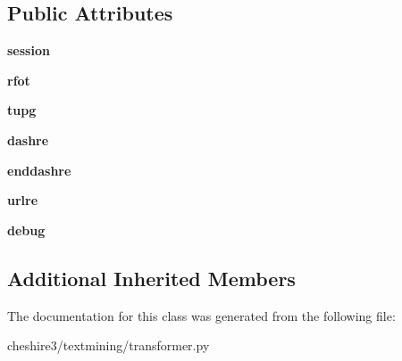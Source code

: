 \subsection*{Public Attributes}
\begin{DoxyCompactItemize}
\item 
\hypertarget{classcheshire3_1_1textmining_1_1transformer_1_1_genia_transformer_a8a36cc2d0b7eefd7f13c4515675b3d67}{{\bfseries session}}\label{classcheshire3_1_1textmining_1_1transformer_1_1_genia_transformer_a8a36cc2d0b7eefd7f13c4515675b3d67}

\item 
\hypertarget{classcheshire3_1_1textmining_1_1transformer_1_1_genia_transformer_a8ed1f95f131d26fbf1276330833123ae}{{\bfseries rfot}}\label{classcheshire3_1_1textmining_1_1transformer_1_1_genia_transformer_a8ed1f95f131d26fbf1276330833123ae}

\item 
\hypertarget{classcheshire3_1_1textmining_1_1transformer_1_1_genia_transformer_a8dfb5b8744586bbe79ceb704948ae986}{{\bfseries tupg}}\label{classcheshire3_1_1textmining_1_1transformer_1_1_genia_transformer_a8dfb5b8744586bbe79ceb704948ae986}

\item 
\hypertarget{classcheshire3_1_1textmining_1_1transformer_1_1_genia_transformer_a81242067af3974ebf3d40e0de9eb1321}{{\bfseries dashre}}\label{classcheshire3_1_1textmining_1_1transformer_1_1_genia_transformer_a81242067af3974ebf3d40e0de9eb1321}

\item 
\hypertarget{classcheshire3_1_1textmining_1_1transformer_1_1_genia_transformer_a47a4b345c0b89ab670826fa7ac9867df}{{\bfseries enddashre}}\label{classcheshire3_1_1textmining_1_1transformer_1_1_genia_transformer_a47a4b345c0b89ab670826fa7ac9867df}

\item 
\hypertarget{classcheshire3_1_1textmining_1_1transformer_1_1_genia_transformer_aedad3164e7e44676c139f067c5216475}{{\bfseries urlre}}\label{classcheshire3_1_1textmining_1_1transformer_1_1_genia_transformer_aedad3164e7e44676c139f067c5216475}

\item 
\hypertarget{classcheshire3_1_1textmining_1_1transformer_1_1_genia_transformer_a3317f1dff92521e1b5b26c7b7eeb4fc3}{{\bfseries debug}}\label{classcheshire3_1_1textmining_1_1transformer_1_1_genia_transformer_a3317f1dff92521e1b5b26c7b7eeb4fc3}

\end{DoxyCompactItemize}
\subsection*{Additional Inherited Members}


The documentation for this class was generated from the following file\-:\begin{DoxyCompactItemize}
\item 
cheshire3/textmining/transformer.\-py\end{DoxyCompactItemize}
